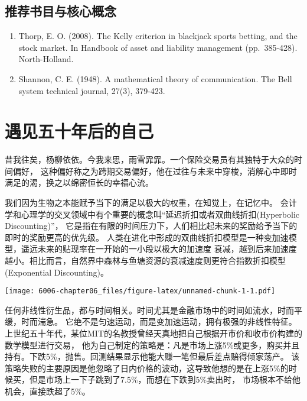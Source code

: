 \documentclass[
  oneside]{book}
\providecommand{\tightlist}{%
  \setlength{\itemsep}{0pt}\setlength{\parskip}{0pt}}
\begin{document}
\hypertarget{ux63a8ux8350ux4e66ux76eeux4e0eux6838ux5fc3ux6982ux5ff5-1}{%
\section{推荐书目与核心概念}\label{ux63a8ux8350ux4e66ux76eeux4e0eux6838ux5fc3ux6982ux5ff5-1}}

\begin{enumerate}
\def\labelenumi{\arabic{enumi}.}
\tightlist
\item
  Thorp, E. O. (2008). The Kelly criterion in blackjack sports betting, and the stock market. In Handbook of asset and liability management (pp.~385-428). North-Holland.
\item
  Shannon, C. E. (1948). A mathematical theory of communication. The Bell system technical journal, 27(3), 379-423.
\end{enumerate}

\hypertarget{ux9047ux89c1ux4e94ux5341ux5e74ux540eux7684ux81eaux5df1}{%
\chapter{遇见五十年后的自己}\label{ux9047ux89c1ux4e94ux5341ux5e74ux540eux7684ux81eaux5df1}}

昔我往矣，杨柳依依。今我来思，雨雪霏霏。一个保险交易员有其独特于大众的时间偏好，
这种偏好称之为跨期交易偏好，他在过往与未来中穿梭，消解心中即时满足的渴，换之以绵密恒长的幸福心流。

我们因为生物之本能赋予当下的满足以极大的权重，在知觉上，在记忆中。
会计学和心理学的交叉领域中有个重要的概念叫``延迟折扣或者双曲线折扣(Hyperbolic Discounting)''，
它是指在有限的时间压力下，人们相比起未来的奖励给予当下的即时的奖励更高的优先级。
人类在进化中形成的双曲线折扣模型是一种变加速模型，遥远未来的贴现率在一开始的一小段以极大的加速度
衰减，越到后来加速度越小。相比而言，自然界中森林与鱼塘资源的衰减速度则更符合指数折扣模型(Exponential
Discounting)。

\texttt{[image: 6006-chapter06\_files/figure-latex/unnamed-chunk-1-1.pdf]}

任何非线性衍生品，都与时间相关。时间尤其是金融市场中的时间如流水，时而平缓，时而湍急。
它绝不是匀速运动，而是变加速运动，拥有极强的非线性特征。上世纪五十年代，某位MIT的名教授曾经天真地把自己根据开市价和收市价构建的数学模型进行交易，
他为自己制定的策略是：凡是市场上涨5\%或更多，购买并且持有。下跌5\%，抛售。回测结果显示他能大赚一笔但最后差点赔得倾家荡产。
该策略失败的主要原因是他忽略了日内价格的波动，这导致他想的是在上涨5\%的时候买，但是市场上一下子跳到了7.5\%，而想在下跌到5\%卖出时，
市场根本不给他机会，直接跌超了5\%。
\end{document}
